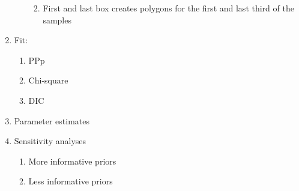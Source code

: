 \documentclass[]{book}
\providecommand{\tightlist}{%
  \setlength{\itemsep}{0pt}\setlength{\parskip}{0pt}}
\begin{document}
\begin{enumerate}
\begin{enumerate}
    \begin{enumerate}
    \def\labelenumiii{\arabic{enumiii}.}
    \tightlist
    \item
      First and last box creates polygons for the first and last third of the samples
    \end{enumerate}
  \end{enumerate}
\item
  Fit:

  \begin{enumerate}
  \def\labelenumii{\arabic{enumii}.}
  \tightlist
  \item
    PPp
  \item
    Chi-square
  \item
    DIC
  \end{enumerate}
\item
  Parameter estimates
\item
  Sensitivity analyses

  \begin{enumerate}
  \def\labelenumii{\arabic{enumii}.}
  \tightlist
  \item
    More informative priors
  \item
    Less informative priors
  \end{enumerate}
\end{enumerate}


\end{document}
